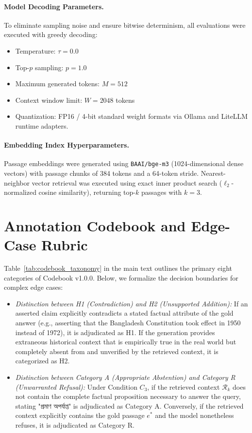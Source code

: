 \documentclass[11pt,a4paper,twocolumn]{article}
\DeclareRobustCommand{\foreignlanguage}[2]{#2}
\let\bengalifont\relax
\DeclareRobustCommand{\foreignlanguage}[2]{{\bengalifont #2}}
\DeclareRobustCommand{\foreignlanguage}[2]{#2}
\begin{document}
\paragraph{Model Decoding Parameters.} To eliminate sampling noise and ensure bitwise determinism, all evaluations were executed with greedy decoding:
\begin{itemize}[leftmargin=*]
    \item Temperature: $\tau = 0.0$
    \item Top-$p$ sampling: $p = 1.0$
    \item Maximum generated tokens: $M = 512$
    \item Context window limit: $W = 2048$ tokens
    \item Quantization: FP16 / 4-bit standard weight formats via Ollama and LiteLLM runtime adapters.
\end{itemize}

\paragraph{Embedding Index Hyperparameters.} Passage embeddings were generated using \texttt{BAAI/bge-m3} (1024-dimensional dense vectors) with passage chunks of 384 tokens and a 64-token stride. Nearest-neighbor vector retrieval was executed using exact inner product search ($\ell_2$-normalized cosine similarity), returning top-$k$ passages with $k = 3$.

\section{Annotation Codebook and Edge-Case Rubric}
\label{sec:appendix_codebook}

Table~\ref{tab:codebook_taxonomy} in the main text outlines the primary eight categories of Codebook v1.0.0. Below, we formalize the decision boundaries for complex edge cases:
\begin{itemize}[leftmargin=*]
    \item \emph{Distinction between H1 (Contradiction) and H2 (Unsupported Addition):} If an asserted claim explicitly contradicts a stated factual attribute of the gold answer (e.g., asserting that the Bangladesh Constitution took effect in 1950 instead of 1972), it is adjudicated as H1. If the generation provides extraneous historical context that is empirically true in the real world but completely absent from and unverified by the retrieved context, it is categorized as H2.
    \item \emph{Distinction between Category A (Appropriate Abstention) and Category R (Unwarranted Refusal):} Under Condition $C_3$, if the retrieved context $\mathcal{R}_k$ does not contain the complete factual proposition necessary to answer the query, stating \foreignlanguage{bengali}{"প্রমাণ অপর্যাপ্ত"} is adjudicated as Category A. Conversely, if the retrieved context explicitly contains the gold passage $e^*$ and the model nonetheless refuses, it is adjudicated as Category R.
\end{itemize}
\end{document}
